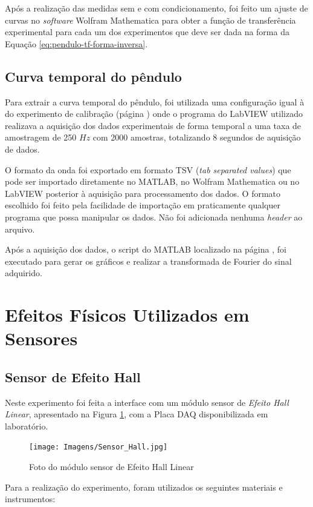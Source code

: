 \documentclass[a4paper]{instrumentacao}
\begin{document}
Após a realização das medidas sem e com condicionamento, foi feito um ajuste de curvas no \textit{software} Wolfram Mathematica para obter a função de transferência experimental para cada um dos experimentos que deve ser dada na forma da Equação \ref{eq:pendulo-tf-forma-inversa}.

\subsection{Curva temporal do pêndulo}

Para extrair a curva temporal do pêndulo, foi utilizada uma configuração igual à do experimento de calibração (página \pageref{sec:pendulo-calibracao-condicionado}) onde o programa do LabVIEW utilizado realizava a aquisição dos dados experimentais de forma temporal a uma taxa de amostragem de 250 $Hz$ com 2000 amostras, totalizando 8 segundos de aquisição de dados.

O formato da onda foi exportado em formato TSV (\textit{tab separated values}) que pode ser importado diretamente no MATLAB, no Wolfram Mathematica ou no LabVIEW posterior à aquisição para processamento dos dados. O formato escolhido foi feito pela facilidade de importação em praticamente qualquer programa que possa manipular os dados. Não foi adicionada nenhuma \textit{header} ao arquivo.

Após a aquisição dos dados, o script do MATLAB localizado na página , foi executado para gerar os gráficos e realizar a transformada de Fourier do sinal adquirido.

\section{Efeitos Físicos Utilizados em Sensores}

\subsection{Sensor de Efeito Hall}
Neste experimento foi feita a interface com um módulo sensor de \textit{Efeito Hall Linear}, apresentado na Figura \ref{fig:efeito-hall}, com a Placa DAQ disponibilizada em laboratório.

\begin{figure}[H]
\centering
\texttt{[image: Imagens/Sensor\_Hall.jpg]}
\caption{Foto do módulo sensor de Efeito Hall Linear}
\label{fig:efeito-hall}
\end{figure}

Para a realização do experimento, foram utilizados os seguintes materiais e instrumentos:
\end{document}
